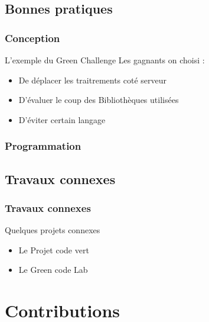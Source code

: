 \documentclass{beamer}
\begin{document}
		\subsection{Bonnes pratiques}
			\begin{frame}
				\frametitle{Conception}
					\begin{block}{L'exemple du Green Challenge}
						Les gagnants on choisi :
						\begin{itemize}
							\item De déplacer les traitrements coté serveur
							\item D'évaluer le coup des Bibliothèques utilisées
							\item D'éviter certain langage
						\end{itemize}
					\end{block}
			\end{frame}
			\begin{frame}
				\frametitle{Programmation}
					
			\end{frame}
			
		\subsection{Travaux connexes}
			\begin{frame}
				\frametitle{Travaux connexes}
				\begin{block}{Quelques projets connexes}
					\begin{itemize}
						\item Le Projet code vert
						\item Le Green code Lab
					\end{itemize}
				\end{block}
			\end{frame}
		
	\section{Contributions}
\end{document}
